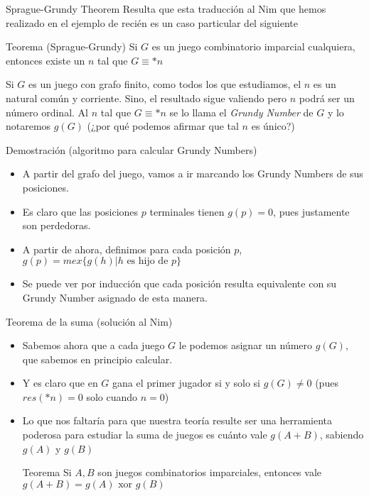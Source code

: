 \documentclass{beamer}
\begin{document}
\begin{frame}{Sprague-Grundy Theorem}
    Resulta que esta traducción al Nim que hemos realizado en el ejemplo de recién es un caso particular del siguiente
    \begin{block}{Teorema (Sprague-Grundy)}
        Si $G$ es un juego combinatorio imparcial cualquiera, entonces existe un $n$ tal que $G \equiv *n$
    \end{block}
    Si $G$ es un juego con grafo finito, como todos los que estudiamos, el $n$ es un natural común y corriente. Sino, el resultado
    sigue valiendo pero $n$ podrá ser un número ordinal. Al $n$ tal que $G \equiv *n$ se lo llama el \textit{Grundy Number} de $G$ y
    lo notaremos $g(G)$ (¿por qué podemos afirmar que tal $n$ es único?)
\end{frame}

\begin{frame}{Demostración (algoritmo para calcular Grundy Numbers)}
    \begin{itemize}
        \item A partir del grafo del juego, vamos a ir marcando los Grundy Numbers de sus posiciones.
        \item Es claro que las posiciones $p$ terminales tienen $g(p) = 0$, pues justamente son perdedoras.
        \item A partir de ahora, definimos para cada posición $p$, $g(p) = mex \{ g(h) | h \mbox{ es hijo de } p \}$
        \item Se puede ver por inducción que cada posición resulta equivalente con su Grundy Number asignado de esta manera.
    \end{itemize}
\end{frame}

\begin{frame}{Teorema de la suma (solución al Nim)}
    \begin{itemize}
        \item Sabemos ahora que a cada juego $G$ le podemos asignar un número $g(G)$, que sabemos en principio calcular.
        \item  Y es claro que en $G$ gana el primer jugador si y solo si $g(G) \neq 0$ (pues $res(*n) = 0$ solo cuando $n=0$)
        \item Lo que nos faltaría para que nuestra teoría resulte ser una herramienta poderosa para estudiar la suma de juegos
        es cuánto vale $g(A+B)$, sabiendo $g(A)$ y $g(B)$
        \begin{block}{Teorema}
          Si $A,B$ son juegos combinatorios imparciales, entonces vale $g(A+B) = g(A) \mbox{\ xor\ } g(B)$
        \end{block}
    \end{itemize}
\end{frame}
\end{document}
